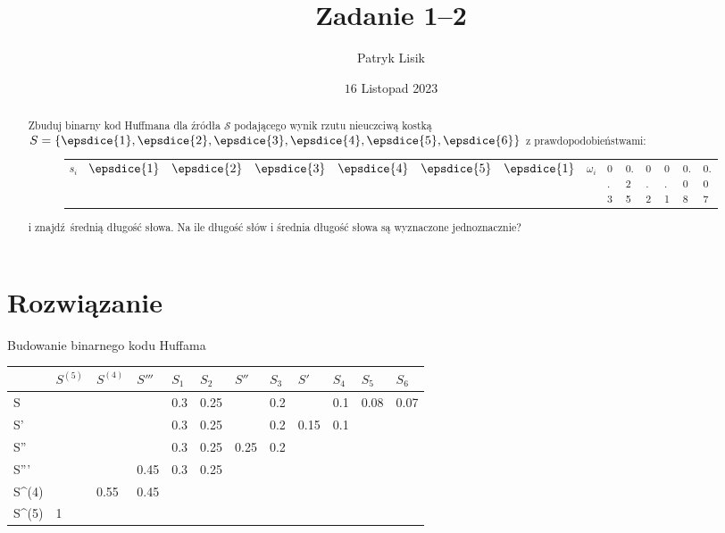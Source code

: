 \documentclass[12pt]{article}
\title{Zadanie 1--2}
\author{Patryk Lisik}
\date{\(16\) Listopad  2023}
\begin{document}
\maketitle
\renewcommand{\abstractname}{Treść}

\begin{abstract}
    Zbuduj binarny kod Huffmana dla źródła $\mathcal{S}$ podającego wynik rzutu nieuczciwą kostką 
    $S = \{ \epsdice{1}, \epsdice{2}, \epsdice{3}, \epsdice{4}, \epsdice{5}, \epsdice{6} \}$ 
    z prawdopodobieństwami:
    \begin{figure}[h]
\centering
\begin{tabular}{ccccccc}
    $s_i$ & $\epsdice{1}$ & $\epsdice{2}$ & $\epsdice{3}$   & $\epsdice{4}$ & $\epsdice{5}$ & $\epsdice{1}$  &\hline
    $\omega_i$      & 0.3  & 0.25 & 0.2 & 0.1 & 0.08 & 0.07 &
\end{tabular}
\label{tab:codes}

\end{figure}

    i znajdź średnią długość słowa. Na ile  długość słów i średnia długość słowa są wyznaczone jednoznacznie?
\end{abstract}


\section*{Rozwiązanie}
Budowanie binarnego kodu Huffama

\begin{table}[h]
\begin{tabular}{|l|l|l|l|l|l|l|l|l|l|l|l|}
\hline
 &
  \cellcolor[HTML]{FFCCC9}$S^{(5)}$ &
   \cellcolor[HTML]{FFCCC9}$S^{(4)}$ &
  \cellcolor[HTML]{FFCCC9}$S'''$ &
  \cellcolor[HTML]{FFCCC9}$S_1$ &
  \cellcolor[HTML]{FFCCC9}$S_2$ &
  \cellcolor[HTML]{FFCCC9}$S''$ &
  \cellcolor[HTML]{FFCCC9}$S_3$ &
  \cellcolor[HTML]{FFCCC9}$S' $&
  \cellcolor[HTML]{FFCCC9}$S_4$&
  \cellcolor[HTML]{FFCCC9}$S_5$ &
  \cellcolor[HTML]{FFCCC9}$S_6$ \\ \hline
\cellcolor[HTML]{FFCCC9}S   &   &      &      & 0.3 & 0.25 &      & 0.2 &      & 0.1 & 0.08 & 0.07 \\ \hline
\cellcolor[HTML]{FFCCC9}S'  &   &      &      & 0.3 & 0.25 &      & 0.2 & 0.15 & 0.1 &      &      \\ \hline
\cellcolor[HTML]{FFCCC9}S'' &   &      &      & 0.3 & 0.25 & 0.25 & 0.2 &      &     &      &      \\ \hline
\cellcolor[HTML]{FFCCC9}S''' &   &      & 0.45 & 0.3 & 0.25 &      &     &      &     &      &      \\ \hline
\cellcolor[HTML]{FFCCC9}S^{(4)}  &   & 0.55 & 0.45 &     &      &      &     &      &     &      &      \\ \hline
\cellcolor[HTML]{FFCCC9}S^{(5)}  & 1 &      &      &     &      &      &     &      &     &      &      \\ \hline
\end{tabular}
\end{table}
\end{document}

